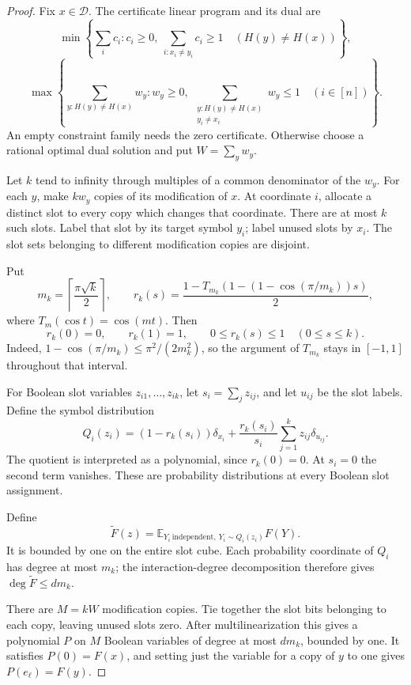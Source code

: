 \begin{proof}
Fix \(x\in\mathcal D\). The certificate linear program and its dual are
\[
 \min\left\{\sum_i c_i:
 c_i\ge0,\
 \sum_{i:x_i\ne y_i}c_i\ge1\quad(H(y)\ne H(x))\right\},
\]
\[
 \max\left\{\sum_{y:H(y)\ne H(x)}w_y:
 w_y\ge0,\
 \sum_{\substack{y:H(y)\ne H(x)\\y_i\ne x_i}}w_y\le1
 \quad(i\in[n])\right\}.
\]
An empty constraint family needs the zero certificate. Otherwise
choose a rational optimal dual solution and put \(W=\sum_yw_y\).

Let \(k\) tend to infinity through multiples of a common denominator
of the \(w_y\). For each \(y\), make \(kw_y\) copies of its
modification of \(x\). At coordinate \(i\), allocate a distinct slot
to every copy which changes that coordinate. There are at most \(k\)
such slots. Label that slot by its target symbol \(y_i\); label unused
slots by \(x_i\). The slot sets belonging to different modification
copies are disjoint.

Put
\[
 m_k=\left\lceil\frac{\pi\sqrt{k}}2\right\rceil,\qquad
 r_k(s)=
 \frac{1-T_{m_k}\!\left(1-(1-\cos(\pi/m_k))s\right)}2,
\]
where \(T_m(\cos t)=\cos(mt)\). Then
\[
 r_k(0)=0,\qquad r_k(1)=1,\qquad
 0\le r_k(s)\le1\quad(0\le s\le k).
\]
Indeed,
\(1-\cos(\pi/m_k)\le\pi^2/(2m_k^2)\), so the argument of
\(T_{m_k}\) stays in \([-1,1]\) throughout that interval.

For Boolean slot variables \(z_{i1},\ldots,z_{ik}\), let
\(s_i=\sum_jz_{ij}\), and let \(u_{ij}\) be the slot labels.
Define the symbol distribution
\[
 Q_i(z_i)=
 (1-r_k(s_i))\delta_{x_i}
 +\frac{r_k(s_i)}{s_i}\sum_{j=1}^kz_{ij}\delta_{u_{ij}}.
\]
The quotient is interpreted as a polynomial, since \(r_k(0)=0\).
At \(s_i=0\) the second term vanishes. These are probability
distributions at every Boolean slot assignment.

Define
\[
 \widetilde F(z)=
 \mathbb E_{Y_i\ \mathrm{independent},\ Y_i\sim Q_i(z_i)}F(Y).
\]
It is bounded by one on the entire slot cube. Each probability
coordinate of \(Q_i\) has degree at most \(m_k\); the interaction-degree
decomposition therefore gives \(\deg\widetilde F\le dm_k\).

There are \(M=kW\) modification copies. Tie together the slot bits
belonging to each copy, leaving unused slots zero. After
multilinearization this gives a polynomial \(P\) on \(M\) Boolean
variables of degree at most \(dm_k\), bounded by one. It satisfies
\(P(0)=F(x)\), and setting just the variable for a copy of \(y\) to
one gives \(P(e_\ell)=F(y)\).


\end{proof}
